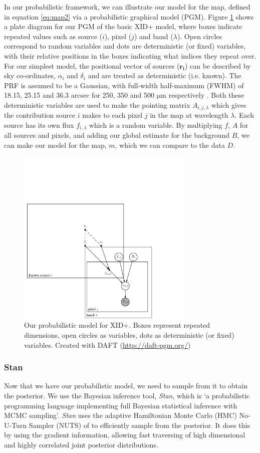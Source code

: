 \documentclass[useAMS,usenatbib]{mnras}
\begin{document}
In our probabilistic framework, we can illustrate our model for the map, defined in equation \ref{eq:map2} via a probabilistic graphical model (PGM). Figure \ref{fig:graph_mod_xid+} shows a plate diagram \citep{Bishop:2006} for our PGM of the basic XID+ model, where boxes  indicate repeated values such as source ($i$), pixel ($j$) and band ($\lambda$). Open circles correspond to random variables and dots are deterministic (or fixed) variables, with their relative positions in the boxes indicating what indices they repeat over. For our simplest model, the positional vector of sources ($\mathbf{r_i}$) can be described by sky co-ordinates, $\alpha_i$ and $\delta_i$ and are treated as deterministic (i.e. known). The PRF is assumed to be a Gaussian, with full-width half-maximum (FWHM) of 18.15, 25.15 and 36.3 arcsec for 250, 350 and 500 $\mathrm{\mu m}$ respectively \citep{Griffin:2010}. Both these deterministic variables are used to make the pointing matrix $A_{i,j,\lambda}$ which gives the contribution source $i$ makes to each pixel $j$ in the map at wavelength $\lambda$. Each source has its own flux $f_{i,\lambda}$ which is a random variable. By multiplying $f$, $A$ for all sources and pixels, and adding our global estimate for the background $B$, we can make our model for the map, $m$, which we can compare to the data $D$. 
\begin{figure}
\includegraphics[width=8.5cm]{./graphical_model.pdf}
\caption{Our probabilistic model for XID+. Boxes represent repeated dimensions, open circles as variables, dots as deterministic (or fixed) variables. Created with DAFT (\url{http://daft-pgm.org/})}\label{fig:graph_mod_xid+}
\end{figure}
 
\subsubsection{Stan}
Now that we have our probabilistic model, we need to sample from it to obtain the posterior. We use the Bayesian inference tool, \textit{Stan}, which is `a probabilistic programming language implementing full Bayesian statistical inference with MCMC sampling'. \textit{Stan} uses the adaptive Hamiltonian Monte Carlo (HMC) No-U-Turn Sampler (NUTS) of \cite{Hoffman:2013} to efficiently sample from the posterior. It does this by using the gradient information, allowing fast traversing of high dimensional and highly correlated joint posterior distributions. 
\end{document}
